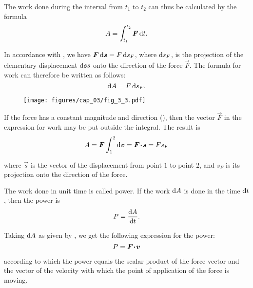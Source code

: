 \noindent
The work done during the interval from $t_1$ to $t_2$ can thus be calculated by the formula
\begin{equation}\label{eq:3_17}
A = \int_{t_1}^{t_2}\boldsymbol{F}\,\mathrm{d} t.
\end{equation}

In accordance with , we have $\boldsymbol{F}\,\mathrm{d}\boldsymbol{s}=F\,\mathrm{d} s_F$, where $\mathrm{d} s_F$, is the projection of the elementary displacement $\mathrm{d}\boldsymbol{s}s$ onto the direction of the force $\vec{F}$. The formula for work can therefore be written as follows:
\begin{equation}\label{eq:3_18}
\mathrm{d} A = F\,\mathrm{d} s_F.
\end{equation}

\begin{figure}[t]
	\begin{center}
		\texttt{[image: figures/cap\_03/fig\_3\_3.pdf]}
		\caption[]{}
		\label{fig:3_3}
	\end{center}
	\vspace{-0.7cm}
\end{figure}

If the force has a constant magnitude and direction (), then the vector $\vec{F}$ in the expression for work may be put outside the integral. The result is
\begin{equation}\label{eq:3_19}
A = \boldsymbol{F}\int_{1}^{2}\mathrm{d}\boldsymbol{v} = \boldsymbol{F\!\cdot\!s} = F s_F
\end{equation}

\noindent
where $\vec{s}$ is the vector of the displacement from point $1$ to point $2$, and $s_F$ is its projection onto the direction of the force.

The work done in unit time is called power. If the work $\mathrm{d} A$ is done in the time $\mathrm{d} t$, then the power is
\begin{equation}\label{eq:3_20}
P = \frac{\mathrm{d} A}{\mathrm{d} t}.
\end{equation}

\noindent
Taking $\mathrm{d} A$ as given by , we get the following expression for the power:
\begin{equation}\label{eq:3_21}
P = \boldsymbol{F\!\cdot\!v}
\end{equation}

\noindent
according to which the power equals the scalar product of the force vector and the vector of the velocity with which the point of application of the force is moving.

